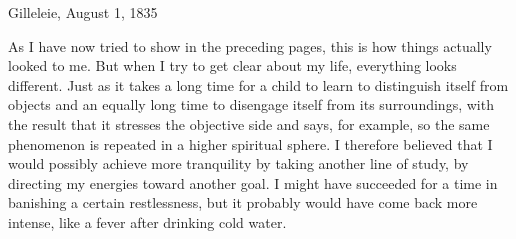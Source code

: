 \begin{flushright}
Gilleleie, August 1, 1835
\end{flushright}

As I have now tried to show in the preceding pages, this is
  how things actually looked to me.
But when I try to get clear about my life, everything looks
  different.
Just as it takes a long time for a child to learn to
  distinguish itself from objects and an equally long time to
  disengage itself from its surroundings, with the result that it
  stresses the objective side and says, for example,  so the same phenomenon is repeated in a higher
  spiritual sphere.
I therefore believed that I would possibly achieve more
  tranquility by taking another line of study, by directing my
  energies toward another goal.
I might have succeeded for a time in banishing a certain
  restlessness, but it probably would have come back more intense,
  like a fever after drinking cold water.


